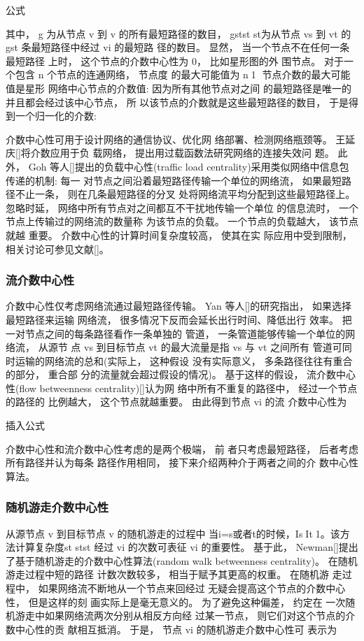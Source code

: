 				公式

				其中， g 为从节点 v 到 v 的所有最短路径的数目， gstst st为从节点 vs 到 vt 的 gst 条最短路径中经过 vi 的最短路 径的数目。 显然， 当一个节点不在任何一条最短路径 上时， 这个节点的介数中心性为 0， 比如星形图的外 围节点。 对于一个包含 n 个节点的连通网络， 节点度 的最大可能值为 n1， 节点介数的最大可能值是星形 网络中心节点的介数值: 因为所有其他节点对之间 的最短路径是唯一的并且都会经过该中心节点， 所 以该节点的介数就是这些最短路径的数目， 于是得到一个归一化的介数:

				介数中心性可用于设计网络的通信协议、优化网 络部署、检测网络瓶颈等。 王延庆[]将介数应用于负 载网络， 提出用过载函数法研究网络的连接失效问 题。 此外， Goh 等人[]提出的负载中心性(traffic load centrality)采用类似网络中信息包传递的机制: 每一 对节点之间沿着最短路径传输一个单位的网络流， 如果最短路径不止一条， 则在几条最短路径的分叉 处将网络流平均分配到这些最短路径上。 忽略时延， 网络中所有节点对之间都互不干扰地传输一个单位 的信息流时， 一个节点上传输过的网络流的数量称 为该节点的负载。 一个节点的负载越大， 该节点就越 重要。 介数中心性的计算时间复杂度较高， 使其在实 际应用中受到限制， 相关讨论可参见文献[]。

	\subsubsection{流介数中心性}
	介数中心性仅考虑网络流通过最短路径传输。 Yan 等人[]的研究指出， 如果选择最短路径来运输 网络流， 很多情况下反而会延长出行时间、降低出行 效率。 把一对节点之间的每条路径看作一条单独的 管道， 一条管道能够传输一个单位的网络流， 从源节 点 vs 到目标节点 vt 的最大流量是指 vs 与 vt 之间所有 管道可同时运输的网络流的总和(实际上， 这种假设 没有实际意义， 多条路径往往有重合的部分， 重合部 分的流量就会超过假设的情况)。 基于这样的假设， 流介数中心性(flow betweenness centrality)[]认为网 络中所有不重复的路径中， 经过一个节点的路径的 比例越大， 这个节点就越重要。 由此得到节点 vi 的流 介数中心性为

				插入公式

				介数中心性和流介数中心性考虑的是两个极端， 前 者只考虑最短路径， 后者考虑所有路径并认为每条 路径作用相同， 接下来介绍两种介于两者之间的介 数中心性算法。

	\subsubsection{随机游走介数中心性}
		从源节点 v 到目标节点 v 的随机游走的过程中 当i=s或者t的时候，IsIt1。该方法计算复杂度st stst 经过 vi 的次数可表征 vi 的重要性。 基于此， Newman[]提出了基于随机游走的介数中心性算法(random walk betweenness centrality)。 在随机游走过程中短的路径 计数次数较多， 相当于赋予其更高的权重。 在随机游 走过程中， 如果网络流不断地从一个节点来回经过 无疑会提高这个节点的介数中心性， 但是这样的刻 画实际上是毫无意义的。 为了避免这种偏差， 约定在 一次随机游走中如果网络流两次分别从相反方向经 过某一节点， 则它们对这个节点的介数中心性的贡 献相互抵消。 于是， 节点 vi 的随机游走介数中心性可 表示为

